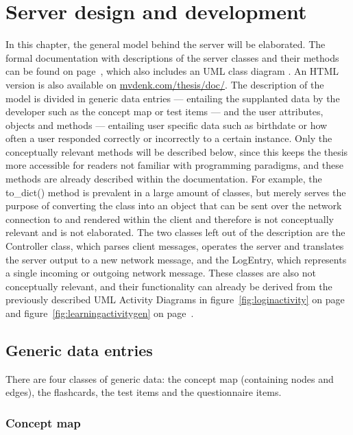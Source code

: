 \chapter{Server design and development}
\label{ch:server}

In this chapter, the general model behind the server will be elaborated. The formal documentation with descriptions of the server classes and their methods can be found on page~\pageref{app:documentation}, which also includes an UML class diagram \cite{uml}. An HTML version is also available on \url{mvdenk.com/thesis/doc/}. The description of the model is divided in generic data entries --- entailing the supplanted data by the developer such as the concept map or test items --- and the user attributes, objects and methods --- entailing user specific data such as birthdate or how often a user responded correctly or incorrectly to a certain instance. Only the conceptually relevant methods will be described below, since this keeps the thesis more accessible for readers not familiar with programming paradigms, and these methods are already described within the documentation. For example, the to\_dict() method is prevalent in a large amount of classes, but merely serves the purpose of converting the class into an object that can be sent over the network connection to and rendered within the client and therefore is not conceptually relevant and is not elaborated. The two classes left out of the description are the Controller class, which parses client messages, operates the server and translates the server output to a new network message, and the LogEntry, which represents a single incoming or outgoing network message. These classes are also not conceptually relevant, and their functionality can already be derived from the previously described UML Activity Diagrams in figure~\ref{fig:loginactivity} on page~\pageref{fig:loginactivity} and figure~\ref{fig:learningactivitygen} on page~\pageref{fig:learningactivitygen}.

\section{Generic data entries}

There are four classes of generic data: the concept map (containing nodes and edges), the flashcards, the test items and the questionnaire items.

\subsection{Concept map}

